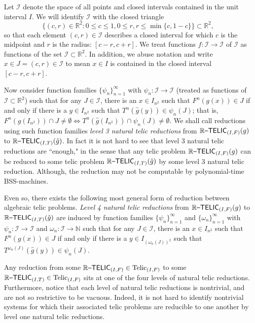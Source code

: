 \documentclass{amsart}
\theoremstyle{theorem}
\theoremstyle{remark}
\DeclareMathOperator{\Telic}{Telic}
\newcommand{\NN}{\mathbb{N}}
\newcommand{\RR}{\mathbb{R}}
\newcommand{\ccRTELIC}{\mathbb{R}\textsf{\upshape --TELIC}}
\newcommand{\cI}{\mathcal{I}}
\begin{document}
Let $\cI$ denote the space of all points and closed intervals contained in the unit interval $I$. We will identify $\cI$ with the closed triangle
\[
\{(c, r) \in \RR^2 : 0 \leq c \leq 1, 0\leq r, r \leq \min\{c, 1-c\}\} \subset \RR^2,
\]
so that each element $(c, r) \in \cI$ describes a closed interval for which $c$ is the midpoint and $r$ is the radius: $[c-r, c+r]$.
We treat functions $f:\cI\rightarrow \cI$ of $\cI$ as functions of the set $\cI \subset \RR^2$. In addition, we abuse notation and write $x \in J=(c,r) \in \cI$ to mean $x \in I$ is contained in the closed interval $[c-r,c+r]$.

Now consider function families $\{\psi_n\}_{n=1}^\infty$ with $\psi_n:\cI\rightarrow \cI$ (treated as functions of $\cI \subset \RR^2$) such that for any $J\in \cI$, there is an $x \in I_{n^2}$ such that $F^n(g(x)) \in J$ if and only if there is a $y \in I_{n^2}$ such that $T^n(\hat{g}(y)) \in \psi_n(J)$; that is, $F^n(g(I_{n^2})) \cap J \neq \emptyset \iff T^n(\hat{g}(I_{n^2})) \cap \psi_n(J) \neq \emptyset$. We shall call reductions using such function families \emph{level 3 natural telic reductions} from $\ccRTELIC_{(I, F)}(g)$ to $\ccRTELIC_{(I, T)}(\hat{g})$.
In fact it is not hard to see that level 3 natural telic reductions are ``enough," in the sense that any telic problem $\ccRTELIC_{(I, F)}(g)$ can be reduced to some telic problem $\ccRTELIC_{(I, T)}(\hat{g})$ by some level 3 natural telic reduction. Although, the reduction may not be computable by polynomial-time BSS-machines.

Even so, there exists the following most general form of reduction between algebraic telic problems.
\emph{Level 4 natural telic reductions} from $\ccRTELIC_{(I, F)}(g)$ to $\ccRTELIC_{(I, T)}(\hat{g})$ are induced by function families $\{\psi_n\}_{n=1}^\infty$ and $\{\omega_n\}_{n=1}^\infty$ with $\psi_n:\cI\rightarrow \cI$ and $\omega_n: \cI \rightarrow \NN$ such that for any $J \in \cI$, there is an $x \in I_{n^2}$ such that $F^n(g(x)) \in J$ if and only if there is a $y \in I_{(\omega_n(J))^2}$ such that $T^{\omega_n(J)}(\hat{g}(y)) \in \psi_n(J)$.

Any reduction from some $\ccRTELIC_{(I, F)} \in \Telic_{(I, F)}$ to some $\ccRTELIC_{(I, T)} \in \Telic_{(I, F)}$ sits at one of the four levels of natural telic reductions.
Furthermore, notice that each level of natural telic reductions is nontrivial, and are not so restrictive to be vacuous.
Indeed, it is not hard to identify nontrivial systems for which their associated telic problems are reducible to one another by level one natural telic reductions.
\end{document}
